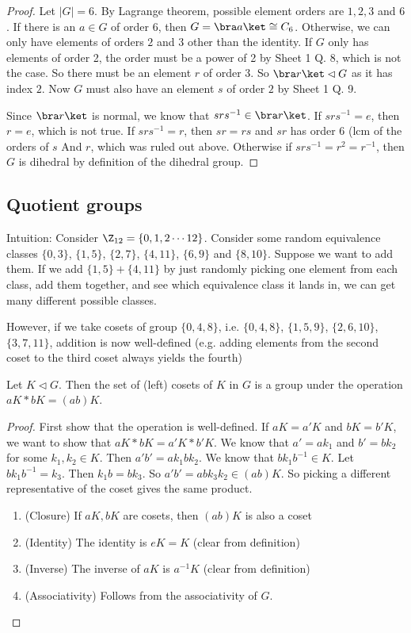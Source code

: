 \documentclass[a4pape]{article}
\begin{document}
\begin{proof}
  Let $|G| = 6$. By Lagrange theorem, possible element orders are $1, 2, 3$ and $6$. If there is an $a\in G$ of order $6$, then $G = \bra a\ket \cong C_6$. Otherwise, we can only have elements of orders $2$ and $3$ other than the identity. If $G$ only has elements of order 2, the order must be a power of 2 by Sheet 1 Q. 8, which is not the case. So there must be an element $r$ of order 3. So $\bra r\ket\lhd G$ as it has index $2$. Now $G$ must also have an element $s$ of order $2$ by Sheet 1 Q. 9.

Since $\bra r\ket$ is normal, we know that $srs^{-1}\in \bra r\ket$. If $srs^{-1} = e$, then $r = e$, which is not true. If $srs^{-1} = r$, then $sr = rs$ and $sr$ has order $6$ (lcm of the orders of $s$ And $r$, which was ruled out above. Otherwise if $srs^{-1} = r^2 = r^{-1}$, then $G$ is dihedral by definition of the dihedral group.
\end{proof}

\subsection{Quotient groups}
Intuition: Consider $\Z_{12} = \{0, 1, 2\cdots 12\}$. Consider some random equivalence classes $\{0, 3\}$, $\{1, 5\}$, $\{2, 7\}$, $\{4, 11\}$, $\{6, 9\}$ and $\{8, 10\}$. Suppose we want to add them. If we add $\{1, 5\} + \{4, 11\}$ by just randomly picking one element from each class, add them together, and see which equivalence class it lands in, we can get many different possible classes.

However, if we take cosets of group $\{0, 4, 8\}$, i.e. $\{0, 4, 8\}$, $\{1, 5, 9\}$, $\{2, 6, 10\}$, $\{3, 7, 11\}$, addition is now well-defined (e.g. adding elements from the second coset to the third coset always yields the fourth)

\begin{prop}
  Let $K\lhd G$. Then the set of (left) cosets of $K$ in $G$ is a group under the operation $aK*bK = (ab)K$.
\end{prop}

\begin{proof}
  First show that the operation is well-defined. If $aK = a'K$ and $bK = b'K$, we want to show that $aK*bK = a'K * b'K$. We know that $a' = ak_1$ and $b' = bk_2$ for some $k_1, k_2\in K$. Then $a'b' = ak_1bk_2$. We know that $bk_1b^{-1}\in K$. Let $bk_1b^{-1} = k_3$. Then $k_1 b = bk_3$. So $a'b' = abk_3k_2\in (ab)K$. So picking a different representative of the coset gives the same product.
  \begin{enumerate}[label=\arabic{*}.]
  \item (Closure) If $aK, bK$ are cosets, then $(ab)K$ is also a coset
  \item (Identity) The identity is $eK = K$ (clear from definition)
  \item (Inverse) The inverse of $aK$ is $a^{-1}K$ (clear from definition)
  \item (Associativity) Follows from the associativity of $G$.
  \end{enumerate}
\end{proof}
\end{document}
